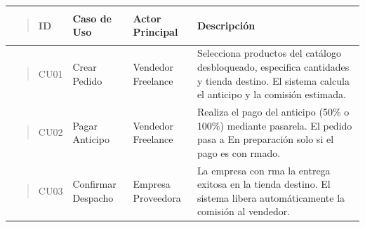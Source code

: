 \documentclass[
]{article}
\newcounter{none} %
\begin{document}
{\def\LTcaptype{none} %
\begin{longtable}[]{@{}
  >{\raggedright\arraybackslash}p{}
  >{\raggedright\arraybackslash}p{}
  >{\raggedright\arraybackslash}p{}
  >{\raggedright\arraybackslash}p{}@{}}
\toprule\noalign{}
\begin{minipage}[b]{\linewidth}\raggedright
\begin{quote}
ID
\end{quote}
\end{minipage} & \begin{minipage}[b]{\linewidth}\raggedright
Caso de Uso
\end{minipage} & \begin{minipage}[b]{\linewidth}\raggedright
Actor Principal
\end{minipage} & \begin{minipage}[b]{\linewidth}\raggedright
Descripción
\end{minipage} \\
\midrule\noalign{}
\endhead
\bottomrule\noalign{}
\endlastfoot
\begin{minipage}[t]{\linewidth}\raggedright
\begin{quote}
CU01
\end{quote}
\end{minipage} & Crear Pedido & Vendedor Freelance & Selecciona
productos del catálogo desbloqueado, especifica cantidades y tienda
destino. El sistema calcula el anticipo y la comisión estimada. \\
\begin{minipage}[t]{\linewidth}\raggedright
\begin{quote}
CU02
\end{quote}
\end{minipage} & Pagar Anticipo & Vendedor Freelance & Realiza el pago
del anticipo (50\% o 100\%) mediante pasarela. El pedido pasa a En
preparación solo si el pago es con rmado. \\
\begin{minipage}[t]{\linewidth}\raggedright
\begin{quote}
CU03
\end{quote}
\end{minipage} & Confirmar Despacho & Empresa Proveedora & La empresa
con rma la entrega exitosa en la tienda destino. El sistema libera
automáticamente la comisión al vendedor. \\

\end{longtable}}
\end{document}
